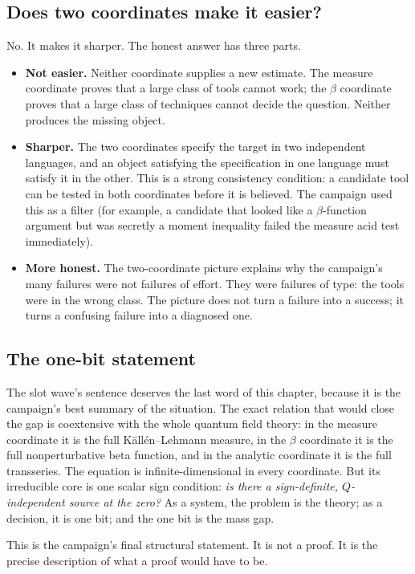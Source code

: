 \subsection{Does two coordinates make it easier?}

No. It makes it sharper. The honest answer has three parts.
\begin{itemize}
\item \textbf{Not easier.} Neither coordinate supplies a new estimate. The measure coordinate
  proves that a large class of tools cannot work; the $\beta$ coordinate proves that a large
  class of techniques cannot decide the question. Neither produces the missing object.
\item \textbf{Sharper.} The two coordinates specify the target in two independent languages, and
  an object satisfying the specification in one language must satisfy it in the other. This is a
  strong consistency condition: a candidate tool can be tested in both coordinates before it is
  believed. The campaign used this as a filter (for example, a candidate that looked like a
  $\beta$-function argument but was secretly a moment inequality failed the measure acid test
  immediately).
\item \textbf{More honest.} The two-coordinate picture explains why the campaign's many failures
  were not failures of effort. They were failures of type: the tools were in the wrong class. The
  picture does not turn a failure into a success; it turns a confusing failure into a diagnosed
  one.
\end{itemize}

\subsection{The one-bit statement}

The slot wave's sentence deserves the last word of this chapter, because it is the campaign's
best summary of the situation. The exact relation that would close the gap is coextensive with
the whole quantum field theory: in the measure coordinate it is the full K\"all\'en--Lehmann
measure, in the $\beta$ coordinate it is the full nonperturbative beta function, and in the
analytic coordinate it is the full transseries. The equation is infinite-dimensional in every
coordinate. But its irreducible core is one scalar sign condition: \emph{is there a sign-definite,
$Q$-independent source at the zero?} As a system, the problem is the theory; as a decision, it is
one bit; and the one bit is the mass gap.

This is the campaign's final structural statement. It is not a proof. It is the precise
description of what a proof would have to be.
